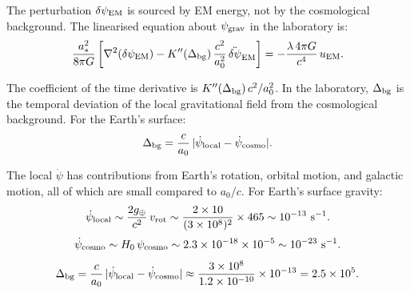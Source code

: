 \documentclass[11pt]{article}
\newcommand{\ee}[1]{\times 10^{#1}}
\newcommand{\psigrav}{\psi_{\rm grav}}
\newcommand{\dpsiEM}{\delta\psi_{\rm EM}}
\theoremstyle{definition}
\theoremstyle{remark}
\begin{document}
The perturbation $\dpsiEM$ is sourced by EM energy, not by the
cosmological background. The linearised equation about $\psigrav$
in the laboratory is:
\begin{equation}
\frac{a_*^2}{8\pi G}\left[
  \nabla^2(\dpsiEM) - K''(\Delta_{\rm bg})\,\frac{c^2}{a_0^2}\,
  \ddot{\delta\psi}_{\rm EM}
\right] = -\frac{\lambda\,4\pi G}{c^4}\,u_{\rm EM}.
\label{eq:lab-perturbation}
\end{equation}

The coefficient of the time derivative is
$K''(\Delta_{\rm bg})\,c^2/a_0^2$. In the laboratory, $\Delta_{\rm bg}$
is the temporal deviation of the local gravitational field from the
cosmological background. For the Earth's surface:
\begin{equation}
\Delta_{\rm bg} = \frac{c}{a_0}\,|\dot\psi_{\rm local}
- \dot\psi_{\rm cosmo}|.
\end{equation}

The local $\dot\psi$ has contributions from Earth's rotation, orbital
motion, and galactic motion, all of which are small compared to $a_0/c$.
For Earth's surface gravity:
\begin{equation}
\dot\psi_{\rm local} \sim \frac{2 g_\oplus}{c^2}\,v_{\rm rot}
\sim \frac{2 \times 10}{(3\ee{8})^2}\times 465
\sim 10^{-13}~\text{s}^{-1}.
\end{equation}
\begin{equation}
\dot\psi_{\rm cosmo} \sim H_0\,\psi_{\rm cosmo}
\sim 2.3\ee{-18}\times 10^{-5} \sim 10^{-23}~\text{s}^{-1}.
\end{equation}
\begin{equation}
\Delta_{\rm bg} = \frac{c}{a_0}\,|\dot\psi_{\rm local}
- \dot\psi_{\rm cosmo}|
\approx \frac{3\ee{8}}{1.2\ee{-10}}\times 10^{-13}
= 2.5\ee{5}.
\end{equation}
\end{document}
